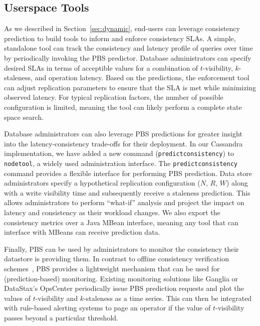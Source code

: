 \subsection{Userspace Tools}

As we described in Section~\ref{sec:dynamic}, end-users can leverage
consistency prediction to build tools to inform and enforce
consistency SLAs. A simple, standalone tool can track the consistency
and latency profile of queries over time by periodically invoking the
PBS predictor. Database administrators can specify desired SLAs in
terms of acceptible values for a combination of $t$-visibility,
$k$-staleness, and operation latency. Based on the predictions, the
enforcement tool can adjust replication parameters to ensure that the
SLA is met while minimizing observed latency. For typical replication
factors, the number of possible configuration is limited, meaning the
tool can likely perform a complete state space search.

Database administrators can also leverage PBS predictions for greater
insight into the latency-consistency trade-offs for their
deployment. In our Cassandra implementation, we have added a new
command (\texttt{predictconsistency}) to \texttt{nodetool}, a widely
used administration interface.  The \texttt{predictconsistency}
command provides a flexible interface for performing PBS
prediction. Data store administrators specify a hypothetical
replication configuration ($N$, $R$, $W$) along with a write
visibility time and subsequently receive a staleness prediction. This
allows administrators to perform ``what-if'' analysis and project the
impact on latency and consistency as their workload changes.  We also
export the consistency metrics over a Java MBean interface, meaning
any tool that can interface with MBeans can receive prediction data.


Finally, PBS can be used by administrators to monitor the consistency
their datastore is providing them. In contrast to offline consistency
verification schemes~\cite{podc-hpl}, PBS provides a lightweight
mechanism that can be used for (prediction-based) monitoring. Existing
monitoring solutions like Ganglia or DataStax's OpsCenter periodically
issue PBS prediction requests and plot the values of $t$-visibility
and $k$-staleness as a time series. This can then be integrated with
rule-based alerting systems to page an operator if the value of
$t$-visibility passes beyond a particular threshold.

